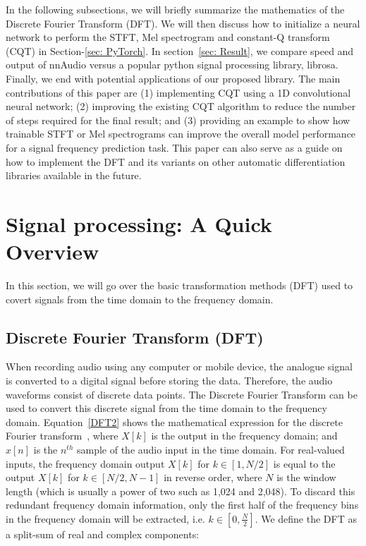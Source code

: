 \documentclass{ieeeaccess}
\begin{document}
In the following subsections, we will briefly summarize the mathematics of the Discrete Fourier Transform (DFT). We will then discuss how to initialize a neural network to perform the STFT, Mel spectrogram and constant-Q transform (CQT) in Section-\ref{sec: PyTorch}. In section~\ref{sec: Result}, we compare speed and output of nnAudio versus a popular python signal processing library, librosa. Finally, we end with potential applications of our proposed library. 
The main contributions of this paper are (1) implementing CQT using a 1D convolutional neural network; (2) improving the existing CQT algorithm to reduce the number of steps required for the final result; and (3) providing an example to show how trainable STFT or Mel spectrograms can improve the overall model performance for a signal frequency prediction task. This paper can also serve as a guide on how to implement the DFT and its variants on other automatic differentiation libraries available in the future.    


\section{Signal processing: A Quick Overview}
In this section, we will go over the basic transformation methods (DFT) used to covert signals from the time domain to the frequency domain. 

\subsection{Discrete Fourier Transform (DFT)} \label{chap:DFT}
When recording audio using any computer or mobile device, the analogue signal is converted to a digital signal before storing the data. Therefore, the audio waveforms consist of discrete data points. The Discrete Fourier Transform can be used to convert this discrete signal from the time domain to the frequency domain. Equation~\eqref{DFT2} shows the mathematical expression for the discrete Fourier transform~\cite{wang1984fast}, where $X[k]$ is the output in the frequency domain; and $x[n]$ is the $n^{th}$ sample of the audio input in the time domain. For real-valued inputs, the frequency domain output $X[k]$ for $k \in [1,N/2]$ is equal to the output $X[k]$ for $k \in [N/2,N-1]$ in reverse order, where $N$ is the window length (which is usually a power of two such as 1,024 and 2,048). To discard this redundant frequency domain information, only the first half of the frequency bins in the frequency domain will be extracted, i.e. $k \in [0,\frac{N}{2}]$. We define the DFT as a split-sum of real and complex components:
\end{document}
